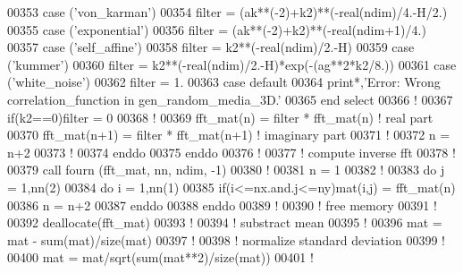 \begin{DoxyCode}
00353           \textcolor{keyword}{case} (\textcolor{stringliteral}{'von\_karman'}) 
00354              filter = (ak**(-2)+k2)**(-\textcolor{keywordtype}{real}(ndim)/4.-H/2.)
00355           \textcolor{keyword}{case} (\textcolor{stringliteral}{'exponential'}) 
00356              filter = (ak**(-2)+k2)**(-\textcolor{keywordtype}{real}(ndim+1)/4.)
00357           \textcolor{keyword}{case} (\textcolor{stringliteral}{'self\_affine'}) 
00358              filter = k2**(-\textcolor{keywordtype}{real}(ndim)/2.-H)
00359           \textcolor{keyword}{case} (\textcolor{stringliteral}{'kummer'}) 
00360              filter = k2**(-\textcolor{keywordtype}{real}(ndim)/2.-H)*exp(-(ag**2*k2/8.))
00361           \textcolor{keyword}{case} (\textcolor{stringliteral}{'white\_noise'}) 
00362              filter = 1.
00363           \textcolor{keyword}{case} default
00364              print*,\textcolor{stringliteral}{'Error: Wrong correlation\_function in gen\_random\_media\_3D.'}
00365           \textcolor{keyword}{end select}
00366           \textcolor{comment}{!}
00367           \textcolor{keyword}{if}(k2==0)filter = 0
00368           \textcolor{comment}{!}
00369           fft\_mat(n)   = filter * fft\_mat(n)   \textcolor{comment}{! real part}
00370           fft\_mat(n+1) = filter * fft\_mat(n+1) \textcolor{comment}{! imaginary part}
00371           \textcolor{comment}{!}
00372           n = n+2
00373           \textcolor{comment}{!}
00374        \textcolor{keyword}{enddo}
00375     \textcolor{keyword}{enddo}
00376     \textcolor{comment}{!}
00377     \textcolor{comment}{! compute inverse fft}
00378     \textcolor{comment}{!}
00379     call fourn (fft\_mat, nn, ndim, -1)
00380     \textcolor{comment}{!}
00381     n = 1
00382     \textcolor{comment}{!}
00383     \textcolor{keyword}{do} j = 1,nn(2)
00384        \textcolor{keyword}{do} i = 1,nn(1)
00385           \textcolor{keyword}{if}(i<=nx.and.j<=ny)mat(i,j) = fft\_mat(n)
00386           n = n+2
00387        \textcolor{keyword}{enddo}
00388     \textcolor{keyword}{enddo}
00389     \textcolor{comment}{!}
00390     \textcolor{comment}{! free memory}
00391     \textcolor{comment}{!}
00392     \textcolor{keyword}{deallocate}(fft\_mat)
00393     \textcolor{comment}{!}
00394     \textcolor{comment}{! substract mean}
00395     \textcolor{comment}{!}
00396     mat = mat - sum(mat)/\textcolor{keyword}{size}(mat)
00397     \textcolor{comment}{!}
00398     \textcolor{comment}{! normalize standard deviation}
00399     \textcolor{comment}{!}
00400     mat = mat/sqrt(sum(mat**2)/\textcolor{keyword}{size}(mat))
00401     \textcolor{comment}{!}

\end{DoxyCode}
